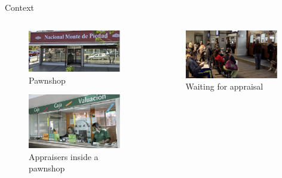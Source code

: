 \documentclass[8pt]{beamer}
\begin{document}
\begin{frame}{Context}
\begin{columns}
\begin{column}{.45\textwidth}
\begin{figure}[H]
    \begin{center}
    \caption{Pawnshop}
        \includegraphics[width=0.95\textwidth]{Figuras/empenio2_.png}
    \end{center}
    \end{figure}
\begin{figure}[H]
    \begin{center}
    \caption{Appraisers  inside a pawnshop}
        \includegraphics[width=0.95\textwidth]{Figuras/empenio9_.png}
    \end{center}
    \end{figure}    
    \end{column}
\begin{column}{.45\textwidth}
\begin{figure}[H]
    \begin{center}
    \caption{Waiting for appraisal}
        \includegraphics[width=0.95\textwidth]{Figuras/empenio11_.png}

\end{center}
\end{figure}
\end{column}
\end{columns}
\end{frame}
\end{document}
